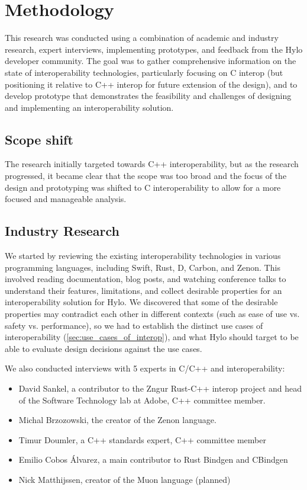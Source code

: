 \section{Methodology}
This research was conducted using a combination of academic and industry research, expert interviews, implementing prototypes, and feedback from the Hylo developer community. The goal was to gather comprehensive information on the state of interoperability technologies, particularly focusing on C interop (but positioning it relative to C++ interop for future extension of the design), and to develop prototype that demonstrates the feasibility and challenges of designing and implementing an interoperability solution.

\subsection{Scope shift}
The research initially targeted towards C++ interoperability, but as the research progressed, it became clear that the scope was too broad and the focus of the design and prototyping was shifted to C interoperability to allow for a more focused and manageable analysis.

\subsection{Industry Research}
We started by reviewing the existing interoperability technologies in various programming languages, including Swift, Rust, D, Carbon, and Zenon. This involved reading documentation, blog posts, and watching conference talks to understand their features, limitations, and collect desirable properties for an interoperability solution for Hylo. We discovered that some of the desirable properties may contradict each other in different contexts (such as ease of use vs. safety vs. performance), so we had to establish the distinct use cases of interoperability (\autoref{sec:use_cases_of_interop}), and what Hylo should  target to be able to evaluate design decisions against the use cases.

We also conducted interviews with 5 experts in C/C++ and interoperability:
\begin{itemize}
    \item David Sankel, a contributor to the Zngur Rust-C++ interop project and head of the Software Technology lab at Adobe, C++ committee member.
    \item Michal Brzozowski, the creator of the Zenon language.
    \item Timur Doumler, a C++ standards expert, C++ committee member
    \item Emilio Cobos Álvarez, a main contributor to Rust Bindgen and CBindgen
    \item Nick Matthijssen, creator of the Muon language (planned)
\end{itemize}

